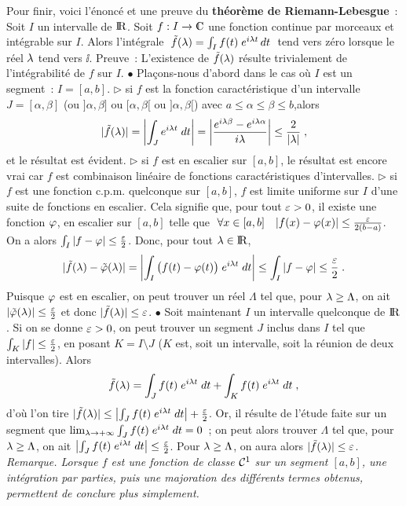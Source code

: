 \documentclass{article}
\begin{document}
Pour finir, voici l'\'enonc\'e et une preuve du {\bf th\'eor\`eme de Riemann-Lebesgue}~:\msk\new
Soit $I$ un intervalle de ${\rm I\kern-0.6mm R}$. Soit $f:I\vers\cmat$ une fonction
continue par morceaux et int\'egrable sur $I$.\ssk\new
Alors l'int\'egrale $\;\tilde{f}(\lambda)=\int_If(t)\;e^{i\lambda t}\,dt\;$ tend vers z\'ero lorsque le r\'eel $\lambda$ tend vers $\ii$.
\pmn\sect
Preuve~:
L'existence de $\tilde{f}(\lambda)$ r\'esulte trivialement de l'int\'egrabilit\'e de $f$
sur $I$.\psn
$\bullet$ Pla\c cons-nous d'abord dans le cas o\`u $I$ est un segment~:
$I=[a,b]$.\pn
$\triangleright$ si $f$ est la fonction caract\'eristique d'un intervalle $J=[\alpha,\beta]$
(ou $]\alpha,\beta]$ ou $[\alpha,\beta[$ ou $]\alpha,\beta[$) avec
$a\le\alpha\le\beta\le b$,alors\vv
$$|\tilde{f}(\lambda)|=\left|\int_Je^{i\lambda t}\;dt\right|=\left|{e^{i\lambda\beta}
  -e^{i\lambda\alpha}\over i\lambda}\right|\le{2\over|\lambda|}\;,$$
et le r\'esultat est \'evident.\pn
$\triangleright$ si $f$ est en escalier sur $[a,b]$, le r\'esultat est encore vrai car $f$
est combinaison lin\'eaire de fonctions caract\'eristiques d'intervalles.\pn
$\triangleright$ si $f$ est une fonction c.p.m. quelconque sur $[a,b]$, $f$ est limite
uniforme sur $I$ d'une suite de fonctions en escalier. Cela signifie que,
pour tout $\varepsilon>0$, il existe une fonction $\varphi$, en escalier sur $[a,b]$
telle que $\;\forall x\in[a,b]\quad|f(x)-\varphi(x)|\le{\varepsilon\over2(b-a)}$.
On a alors
$\int_I|f-\varphi|\le{\varepsilon\over2}$. Donc, pour tout $\lambda\in{\rm I\kern-0.6mm R}$,
$$|\tilde{f}(\lambda)-\tilde{\varphi}(\lambda)|=\left|\int_I\big(f(t)-\varphi(t)\big)\;
  e^{i\lambda t}\;dt\right|\le\int_I|f-\varphi|\le{\varepsilon\over2}\;.$$
Puisque $\varphi$ est en escalier, on peut trouver un r\'eel $\Lambda$ tel que,
pour $\lambda\ge\Lambda$, on ait $|\tilde{\varphi}(\lambda)|\le{\varepsilon\over2}$ et donc
$|\tilde{f}(\lambda)|\le\varepsilon$.\pmn
$\bullet$ Soit maintenant $I$ un intervalle quelconque de ${\rm I\kern-0.6mm R}$.
Si on se donne $\varepsilon>0$, on peut trouver un
segment $J$ inclus dans $I$ tel que $\int_K|f|\le{\varepsilon\over2}$,
en posant $K=I\setminus J$ ($K$ est, soit un intervalle, soit la
r\'eunion de deux intervalles). Alors\vv
$$\tilde{f}(\lambda)=\int_Jf(t)\;e^{i\lambda t}\;dt+
  \int_Kf(t)\;e^{i\lambda t}\;dt\;,$$
d'o\`u l'on tire $|\tilde{f}(\lambda)|\le\left|\int_Jf(t)\;e^{i\lambda t}\;dt
\right|+{\varepsilon\over2}$. Or, il r\'esulte de l'\'etude faite sur un segment que
$\lim_{\lambda\rightarrow+\infty}\int_Jf(t)\;e^{i\lambda t}\;dt=0$~;
on peut alors trouver $\Lambda$ tel que, pour $\lambda\ge\Lambda$, on ait
$\left|\int_Jf(t)\;e^{i\lambda t}\;dt\right|\le{\varepsilon\over2}$. Pour
$\lambda\ge\Lambda$, on aura alors $|\tilde{f}(\lambda)|\le\varepsilon$.
\psn
{\it Remarque. Lorsque $f$ est une fonction de classe ${\cal C}^1$ sur un segment
$[a,b]$, une int\'egration par parties, puis une majoration des diff\'erents
termes obtenus, per\-mettent de conclure plus simplement.}
\end{document}
